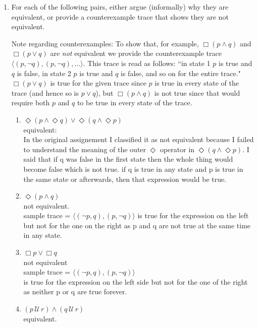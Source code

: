 \documentclass{article}
\newcommand{\Until}{\,\mathcal{U}\,}
\begin{document}

\begin{enumerate}
\item For each of the following pairs, either argue (informally) why they are equivalent, or provide a counterexample trace that shows they are not equivalent.

    {\sc Note} regarding counterexamples: To show that, for example, $\Box (p \land q)$ and $\Box (p \lor q)$ are {\em not} equivalent we provide the counterexample trace $\langle (p,\neg q), (p,\neg q), \ldots \rangle$. This trace is read as follows: ``in state 1 $p$ is true and $q$ is false, in state 2 $p$ is true and $q$ is false, and so on for the entire trace." $\Box (p \lor q)$ is true for the given trace since $p$ is true in every state of the trace (and hence so is $p \lor q$), but $\Box (p \land q)$ is not true since that would require both $p$ and $q$ to be true in every state of the trace.
\begin{enumerate}
\item {}
  $\Diamond(p\land\Diamond q)\lor\Diamond(q\land\Diamond p)$
  \\ equivalent: \\ In the original assignement I classified it as not
  equivalent because I failed to understand the meaning of the outer
  $\Diamond$ operator in $\Diamond(q\land\Diamond p)$. I said that if
  q was false in the first state then the whole thing would become
  false which is not true. if q is true in any state and p is true in the same state or afterwards, then that expression would be true. \\
\item {}  $\Diamond(p\land q)$ \\
  not equivalent.\\
  sample trace = $\langle (\neg p, q), (p, \neg q) \rangle$ is true for the expression on the left but not for the one on the right as p and q are not true at the same time in any state. \\
\item {} $\Box p \lor \Box q$ \\
  not equivalent \\
  sample trace = $\langle (\neg p, q), (p, \neg q) \rangle$ \\
  is true for the expression on the left side but not for the one of the right as neither p or q are true forever. \\
\item \makebox[1.5in][l]{$(p\land q)\Until r$} $(p\Until r)\land (q\Until r)$ \\
 equivalent.
  

\end{enumerate}
\end{enumerate}
\end{document}

